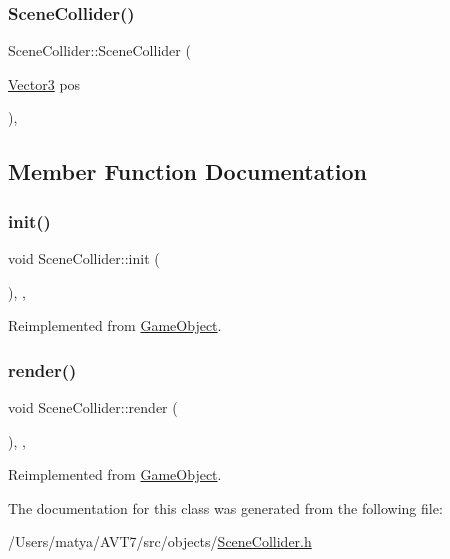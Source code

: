 \subsubsection{\texorpdfstring{Scene\+Collider()}{SceneCollider()}}
{\footnotesize\ttfamily Scene\+Collider\+::\+Scene\+Collider (\begin{DoxyParamCaption}\item[{\hyperlink{class_vector3}{Vector3}}]{pos }\end{DoxyParamCaption})\hspace{0.3cm}{\ttfamily [inline]}, {\ttfamily [explicit]}}



\subsection{Member Function Documentation}
\mbox{\label{class_scene_collider_a2b2aae1d24b6f40188150d3002e00218}} 
\subsubsection{\texorpdfstring{init()}{init()}}
{\footnotesize\ttfamily void Scene\+Collider\+::init (\begin{DoxyParamCaption}{ }\end{DoxyParamCaption})\hspace{0.3cm}{\ttfamily [inline]}, {\ttfamily [override]}, {\ttfamily [virtual]}}



Reimplemented from \hyperlink{class_game_object_aecb2c1b9f69715d854f7604d5d7978ec}{Game\+Object}.

\mbox{\label{class_scene_collider_aa46bbfb6657449115aa6855a8f46e3f5}} 
\subsubsection{\texorpdfstring{render()}{render()}}
{\footnotesize\ttfamily void Scene\+Collider\+::render (\begin{DoxyParamCaption}{ }\end{DoxyParamCaption})\hspace{0.3cm}{\ttfamily [inline]}, {\ttfamily [override]}, {\ttfamily [virtual]}}



Reimplemented from \hyperlink{class_game_object_a484efb66a7a27c101e84c11d9905d7a6}{Game\+Object}.



The documentation for this class was generated from the following file\+:\begin{DoxyCompactItemize}
\item 
/\+Users/matya/\+A\+V\+T7/src/objects/\hyperlink{_scene_collider_8h}{Scene\+Collider.\+h}\end{DoxyCompactItemize}
